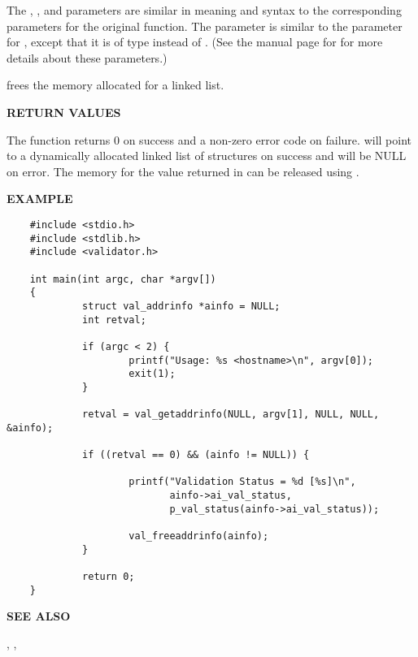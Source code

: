 The , , and  parameters are similar
in meaning and syntax to the corresponding parameters for the original
 function.  The  parameter is similar to the
 parameter for , except that it is of type
 instead of .  (See
the manual page for  for more details about these
parameters.)

 frees the memory allocated for a
 linked list.

{\bf RETURN VALUES}

The  function returns 0 on success and a non-zero
error code on failure.   will point to a dynamically allocated
linked list of  structures on success and will be
NULL on error.  The memory for the value returned in  can be
released using .

{\bf EXAMPLE}

\begin{verbatim}
    #include <stdio.h>
    #include <stdlib.h>
    #include <validator.h>

    int main(int argc, char *argv[])
    {
             struct val_addrinfo *ainfo = NULL;
             int retval;

             if (argc < 2) {
                     printf("Usage: %s <hostname>\n", argv[0]);
                     exit(1);
             }
    
             retval = val_getaddrinfo(NULL, argv[1], NULL, NULL, &ainfo);

             if ((retval == 0) && (ainfo != NULL)) {

                     printf("Validation Status = %d [%s]\n",
                            ainfo->ai_val_status,
                            p_val_status(ainfo->ai_val_status));

                     val_freeaddrinfo(ainfo);
             }

             return 0;
    }
\end{verbatim}

{\bf SEE ALSO}

, , 

